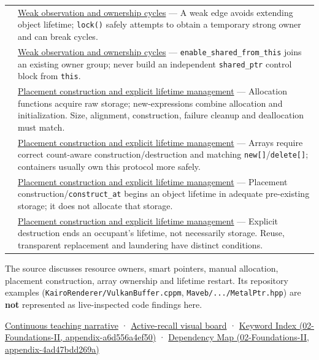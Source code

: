 {\begin{longtable}[]{@{}
  >{\raggedright\arraybackslash}p{}
  >{\raggedright\arraybackslash}p{}@{}}
155 & \hyperref[appendix-b9548675eb2b]{Weak observation and ownership cycles} --- A weak edge avoids extending object lifetime; \texttt{lock()} safely attempts to obtain a temporary strong owner and can break cycles. \\
156 & \hyperref[appendix-b9548675eb2b]{Weak observation and ownership cycles} --- \texttt{enable\_shared\_from\_this} joins an existing owner group; never build an independent \texttt{shared\_ptr} control block from \texttt{this}. \\
157 & \hyperref[appendix-f56c3e43fd4e]{Placement construction and explicit lifetime management} --- Allocation functions acquire raw storage; new-expressions combine allocation and initialization. Size, alignment, construction, failure cleanup and deallocation must match. \\
158 & \hyperref[appendix-f56c3e43fd4e]{Placement construction and explicit lifetime management} --- Arrays require correct count-aware construction/destruction and matching \texttt{new{[}{]}}/\texttt{delete{[}{]}}; containers usually own this protocol more safely. \\
159 & \hyperref[appendix-f56c3e43fd4e]{Placement construction and explicit lifetime management} --- Placement construction/\texttt{construct\_at} begins an object lifetime in adequate pre-existing storage; it does not allocate that storage. \\
160 & \hyperref[appendix-f56c3e43fd4e]{Placement construction and explicit lifetime management} --- Explicit destruction ends an occupant's lifetime, not necessarily storage. Reuse, transparent replacement and laundering have distinct conditions. \\
\end{longtable}
}

The source discusses resource owners, smart pointers, manual allocation, placement construction, array ownership and lifetime restart. Its repository examples (\texttt{KairoRenderer/VulkanBuffer.cppm}, \texttt{Maveb/.../MetalPtr.hpp}) are \textbf{not} represented as live-inspected code findings here.

\href{Continuous\%20Notes/Computing\%20Foundations\%20-\%20From\%20Bits\%20to\%20C++\%20and\%20Systems\%20APIs\#From\%20a\%20live\%20object\%20to\%20responsible\%20resource\%20ownership}{Continuous teaching narrative} · \hyperref[appendix-960160274237]{Active-recall visual board} · \href{../02-Foundations-II/main.pdf\#nameddest=appendix-a6d556a4ef50}{Keyword Index (02-Foundations-II, appendix-a6d556a4ef50)} · \href{../02-Foundations-II/main.pdf\#nameddest=appendix-4ad47bdd269a}{Dependency Map (02-Foundations-II, appendix-4ad47bdd269a)}

